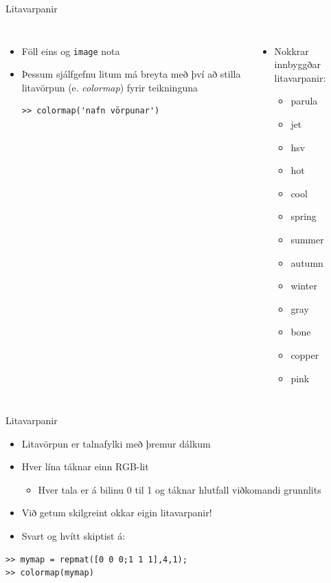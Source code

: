 \documentclass[handout]{beamer}
\begin{document}
\begin{frame}[fragile]{Litavarpanir}
\begin{columns}
\begin{itemize}
 \item Föll eins og \texttt{image} nota 
 \item Þessum sjálfgefnu litum má breyta með því að stilla litavörpun (e. \emph{colormap}) fyrir teikninguna
\begin{verbatim}
>> colormap('nafn vörpunar')
\end{verbatim}
\end{itemize}
\begin{itemize}
 \item Nokkrar innbyggðar litavarpanir:
 \begin{itemize}
  \item parula
  \item jet
  \item hsv
  \item hot
  \item cool
  \item spring
  \item summer
  \item autumn
  \item winter
  \item gray
  \item bone
  \item copper
  \item pink
 \end{itemize}
\end{itemize}
\end{columns}
\end{frame}

\begin{frame}[fragile]{Litavarpanir}
\begin{itemize}
 \item Litavörpun er talnafylki með þremur dálkum
 \item Hver lína táknar einn RGB-lit
 \begin{itemize}
  \item Hver tala er á bilinu 0 til 1 og táknar hlutfall viðkomandi grunnlits
 \end{itemize}
 \item Við getum skilgreint okkar eigin litavarpanir!
 \item Svart og hvítt skiptist á:
\end{itemize}
\begin{verbatim}
>> mymap = repmat([0 0 0;1 1 1],4,1);
>> colormap(mymap)
\end{verbatim}
\end{frame}
\end{document}
